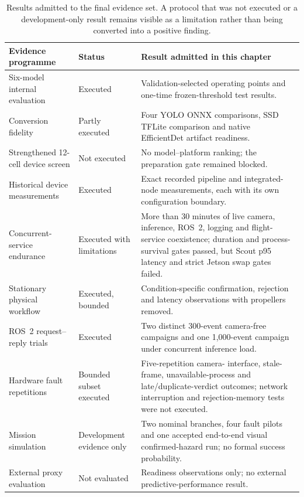 \begin{table}[H]
  \centering
  \caption{Results admitted to the final evidence set. A protocol that was not
  executed or a development-only result remains visible as a limitation rather
  than being converted into a positive finding.}
  \label{tab:results-evidence-status}
  \scriptsize
  \begin{tabularx}{\textwidth}{@{}p{}p{}X@{}}
    \toprule
    Evidence programme & Status & Result admitted in this chapter \\
    \midrule
    Six-model internal evaluation & Executed & Validation-selected operating
    points and one-time frozen-threshold test results. \\
    Conversion fidelity & Partly executed & Four YOLO ONNX comparisons, SSD
    TFLite comparison and native EfficientDet artifact readiness. \\
    Strengthened 12-cell device screen & Not executed & No model--platform ranking;
    the preparation gate remained blocked. \\
    Historical device measurements & Executed & Exact recorded pipeline and
    integrated-node measurements, each with its own configuration boundary. \\
    Concurrent-service endurance & Executed with limitations & More than 30
    minutes of live camera, inference, ROS~2, logging and flight-service
    coexistence; duration and process-survival gates passed, but Scout p95
    latency and strict Jetson swap gates failed. \\
    Stationary physical workflow & Executed, bounded & Condition-specific
    confirmation, rejection and latency observations with propellers removed. \\
    ROS~2 request--reply trials & Executed & Two distinct 300-event camera-free
    campaigns and one 1,000-event campaign under concurrent inference load. \\
    Hardware fault repetitions & Bounded subset executed & Five-repetition camera-
    interface, stale-frame, unavailable-process and late/duplicate-verdict
    outcomes; network interruption and rejection-memory tests were not executed. \\
    Mission simulation & Development evidence only & Two nominal branches, four fault
    pilots and one accepted end-to-end visual confirmed-hazard run; no formal
    success probability. \\
    External proxy evaluation & Not evaluated & Readiness observations only; no
    external predictive-performance result. \\
    \bottomrule
  \end{tabularx}
\end{table}

